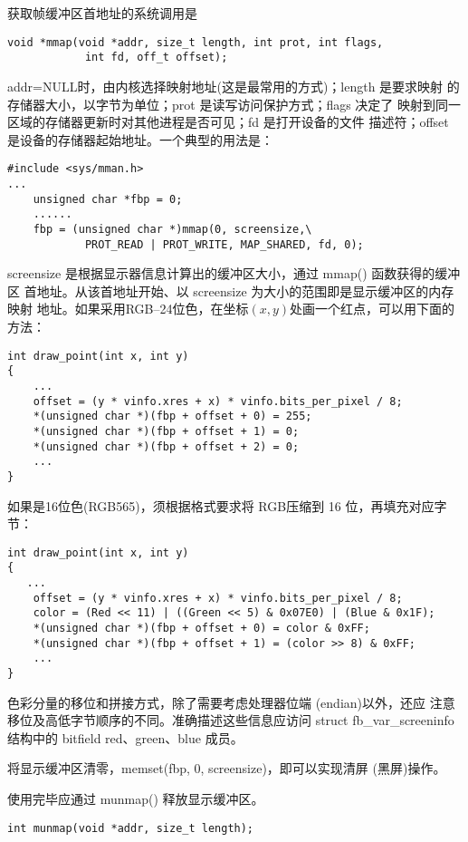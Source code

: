 获取帧缓冲区首地址的系统调用是
\begin{lstlisting}
void *mmap(void *addr, size_t length, int prot, int flags,
            int fd, off_t offset);
\end{lstlisting}
addr=NULL时，由内核选择映射地址(这是最常用的方式)；length 是要求映射
的存储器大小，以字节为单位；prot 是读写访问保护方式；flags 决定了
映射到同一区域的存储器更新时对其他进程是否可见；fd 是打开设备的文件
描述符；offset 是设备的存储器起始地址。一个典型的用法是：

\begin{lstlisting}
#include <sys/mman.h>
...
    unsigned char *fbp = 0;
    ......
    fbp = (unsigned char *)mmap(0, screensize,\
            PROT_READ | PROT_WRITE, MAP_SHARED, fd, 0);
\end{lstlisting}
screensize 是根据显示器信息计算出的缓冲区大小，通过 mmap() 函数获得的缓冲区
首地址。从该首地址开始、以 screensize 为大小的范围即是显示缓冲区的内存映射
地址。如果采用RGB--24位色，在坐标$(x, y)$处画一个红点，可以用下面的方法：
\begin{lstlisting}
int draw_point(int x, int y)
{
	...
    offset = (y * vinfo.xres + x) * vinfo.bits_per_pixel / 8;
    *(unsigned char *)(fbp + offset + 0) = 255;
    *(unsigned char *)(fbp + offset + 1) = 0;
    *(unsigned char *)(fbp + offset + 2) = 0;
    ...
}
\end{lstlisting}

如果是16位色(RGB565)，须根据格式要求将 RGB压缩到 16 位，再填充对应字节：

\begin{lstlisting}
int draw_point(int x, int y)
{
   ...
    offset = (y * vinfo.xres + x) * vinfo.bits_per_pixel / 8;
    color = (Red << 11) | ((Green << 5) & 0x07E0) | (Blue & 0x1F);
    *(unsigned char *)(fbp + offset + 0) = color & 0xFF;
    *(unsigned char *)(fbp + offset + 1) = (color >> 8) & 0xFF;
    ...
}
\end{lstlisting}

色彩分量的移位和拼接方式，除了需要考虑处理器位端 (endian)以外，还应
注意移位及高低字节顺序的不同。准确描述这些信息应访问
struct fb\_var\_screeninfo 结构中的 bitfield red、green、blue 成员。

将显示缓冲区清零，memset(fbp, 0, screensize)，即可以实现清屏 (黑屏)操作。

使用完毕应通过 munmap() 释放显示缓冲区。
\begin{lstlisting}
int munmap(void *addr, size_t length);
\end{lstlisting}


